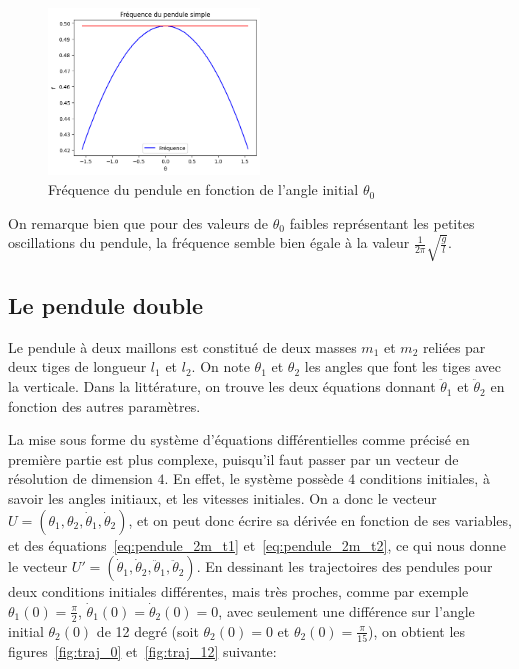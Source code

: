 \begin{figure}[htbp!]
	\centering
	\includegraphics[width=0.5\textwidth]{res/freq_pendule_simple.png}
	\caption{Fréquence du pendule en fonction de l'angle initial $ \theta_{0}$}
	\label{fig:frequences}
\end{figure}

\bigskip

On remarque bien que pour des valeurs de $ \theta_0 $ faibles représentant les petites oscillations du pendule, 
la fréquence semble bien égale à la valeur $ \frac{1}{2 \pi} \sqrt{\frac{g}{l}} $.

\subsection{Le pendule double}
Le pendule à deux maillons est constitué de deux masses $ m_1 $ et $ m_2 $ 
reliées par deux tiges de longueur $ l_1 $ et $ l _2 $. On note $ \theta_1 $ et $ \theta_2 $ les angles
que font les tiges avec la verticale. Dans la littérature, on trouve les deux équations donnant $\ddot \theta_1$ et $\ddot \theta_2$ en fonction des autres paramètres.

La mise sous forme du système d'équations différentielles comme précisé en première partie est plus complexe,
puisqu'il faut passer par un vecteur de résolution de dimension $4$.
En effet, le système possède $4$ conditions initiales, à savoir les angles initiaux, et les vitesses initiales.
On a donc le vecteur $ U = (\theta_1, \theta_2, \dot \theta_1, \dot \theta_2) $, et on peut donc écrire sa dérivée en fonction de ses variables, et des équations~\ref{eq:pendule_2m_t1} et~\ref{eq:pendule_2m_t2},
ce qui nous donne le vecteur $ U' = (\dot \theta_1, \dot \theta_2, \ddot \theta_1, \ddot \theta_2) $.
\medbreak
En dessinant les trajectoires des pendules pour deux conditions initiales différentes, mais très proches, comme par exemple 
$ \theta_1(0) = \frac{\pi}{2} $, $ \dot \theta_1(0) = \dot \theta_2(0) = 0 $, avec seulement une différence sur l'angle initial $ \theta_2(0) $ de 12 degré (soit $ \theta_2(0) = 0 $ et $ \theta_2(0) = \frac{\pi}{15} $),
on obtient les figures~\ref{fig:traj_0} et~\ref{fig:traj_12} suivante:


